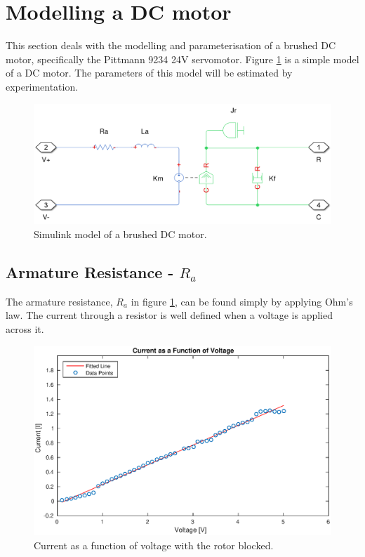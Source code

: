 \section{Modelling a DC motor}
This section deals with the modelling and parameterisation of a brushed DC motor, specifically the Pittmann 9234 24V servomotor.
Figure \ref{fig:dcmotormodel} is a simple model of a DC motor.
The parameters of this model will be estimated by experimentation.

\begin{figure}[!h]
	\centering
	\includegraphics[width=\linewidth]{graphics/dcmotormodel.png}
	\caption{Simulink model of a brushed DC motor.}
	\label{fig:dcmotormodel}
\end{figure}


\subsection{Armature Resistance - $R_a$}
The armature resistance, $R_a$ in figure \ref{fig:dcmotormodel}, can be found simply by applying Ohm's law.
The current through a resistor is well defined when a voltage is applied across it.

\begin{figure}[!h]
	\centering
	\includegraphics[width=\linewidth]{graphics/raplot}
	\caption{Current as a function of voltage with the rotor blocked.}
	\label{fig:raplot}
\end{figure}

